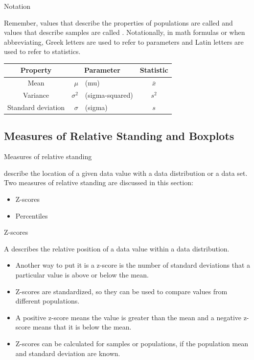 \documentclass[xcolor=table, handout]{beamer}
\begin{document}
\begin{frame}{Notation}
\begin{block}{}
Remember, values that describe the properties of populations are called  and values that describe samples are called . Notationally, in math formulas or when abbreviating, Greek letters are used to refer to parameters and Latin letters are used to refer to statistics.
\pause
\begin{center}
\begin{tabular}{c |r l | c}
Property & \multicolumn{2}{c|}{Parameter} & Statistic\\
\hline
Mean & $\mu$ & (mu) & $\bar x$\\
Variance & $\sigma^2$ &(sigma-squared) & $s^2$\\
Standard deviation & $\sigma$ &(sigma) & $s$
\end{tabular}
\end{center} 
\end{block}
\end{frame}

\subsection{Measures of Relative Standing and Boxplots}

\begin{frame}{Measures of relative standing}
\begin{block}{}
 describe the location of a given data value with a data distribution or a data set.\\
\medskip
Two measures of relative standing are discussed in this section:
\begin{itemize}
\item Z-scores
\item Percentiles
\end{itemize}
\end{block}
\end{frame}

\begin{frame}{Z-scores}
\begin{block}{}
A  describes the relative position of a data value within a data distribution.
\begin{itemize}
\pause
\item Another way to put it is a z-score is the number of standard deviations that a particular value is above or below the mean.
\pause
\item Z-scores are standardized, so they can be used to compare values from different populations.
\pause
\item A positive z-score means the value is greater than the mean and a negative z-score means that it is below the mean. 
\pause
\item Z-scores can be calculated for samples or populations, if the population mean and standard deviation are known.
\end{itemize}
\end{block}
\end{frame}
\end{document}
